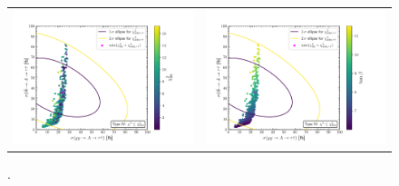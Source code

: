 \documentclass[12pt]{article}
\begin{document}
\begin{figure}[ht!]
	\begin{center}
		\begin{tabular}{cc}
			\centering
			\hspace*{-3mm}
			\includegraphics[scale=0.40]{figs/4_LLxs96.pdf} &
			\includegraphics[scale=0.40]{figs/4_LLxstb.pdf}
		\end{tabular}
		\caption{.}
		\label{fig:typeiisigma}
	\end{center}
\end{figure}

\end{document}
